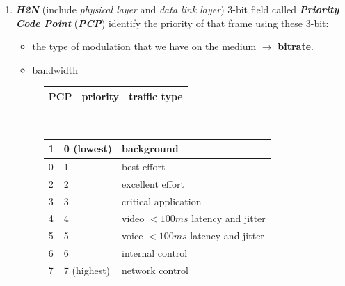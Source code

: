 \begin{enumerate}[nosep]
    
    \item \textbf{\textit{H2N}} (include \textit{physical layer} and \textit{data link layer}) 3-bit field called \textbf{\textit{Priority Code Point}} (\textbf{\textit{PCP}}) identify the priority of that frame using these 3-bit:
    \begin{itemize}[nosep]
        \item the type of modulation that we have on the medium $\rightarrow$ \textbf{bitrate}.
        \item bandwidth
    \end{itemize}
    \begin{figure}[h]
        \centering
        \begin{tabular}{ | p{1cm} | p{3cm} | p{7cm} | } \hline
            \textbf{PCP} & \textbf{priority} & \textbf{traffic type} \\ \hline
        \end{tabular} \\
        \begin{tabular}{ | p{1cm} | p{3cm} | p{7cm} | } \hline
            1 & 0 (lowest) & background \\ \hline
            0 & 1 & best effort \\ \hline
            2 & 2 & excellent effort \\ \hline
            3 & 3 & critical application \\ \hline
            4 & 4 & video $<100ms$ latency and jitter \\ \hline
            5 & 5 & voice $<100ms$ latency and jitter \\ \hline
            6 & 6 & internal control \\ \hline
            7 & 7 (highest) & network control \\ \hline
        \end{tabular}
    \end{figure}


\end{enumerate}
